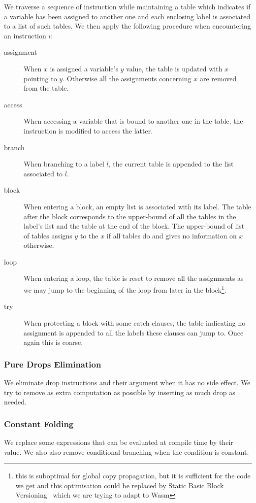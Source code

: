 \documentclass[a4paper,11pt]{article}
\begin{document}
We traverse a sequence of instruction while maintaining a table which indicates
if a variable has been assigned to another one and each enclosing label is
associated to a list of such tables. We then apply the following procedure when
encountering an instruction $i$:
\begin{description}
  \item[assignment] When $x$ is assigned a variable's $y$ value, the table is
    updated with $x$ pointing to $y$. Otherwise all the assignments concerning
    $x$ are removed from the table.
  \item[access] When accessing a variable that is bound to another one in the
    table, the instruction is modified to access the latter.
  \item[branch] When branching to a label $l$, the current table is appended to
    the list associated to $l$.
  \item[block] When entering a block, an empty list is associated with its
    label. The table after the block corresponds to the upper-bound of all the
    tables in the label's list and the table at the end of the block. The
    upper-bound of list of tables assigns $y$ to the $x$ if all tables do and
    gives no information on $x$ otherwise.
  \item[loop] When entering a loop, the table is reset to remove all the
    assignments as we may jump to the beginning of the loop from later in the
    block\footnote{this is suboptimal for global copy propagation, but it is
    sufficient for the code we get and this optimisation could be replaced by
    Static Basic Block Versioning~\cite{melanccon2024static} which we are trying
    to adapt to Wasm}.
  \item[try] When protecting a block with some \textsf{catch} clauses, the table
    indicating no assignment is appended to all the labels these clauses can
    jump to. Once again this is coarse.
\end{description}
\subsubsection{Pure Drops Elimination}
We eliminate \textsf{drop} instructions and
their argument when it has no side effect. We try to remove as extra
computation as possible by inserting as much \textsf{drop} as needed.

\subsubsection{Constant Folding}
We replace some expressions that can be evaluated at compile time by their
value. We also also remove conditional branching when the condition is constant.
\end{document}

